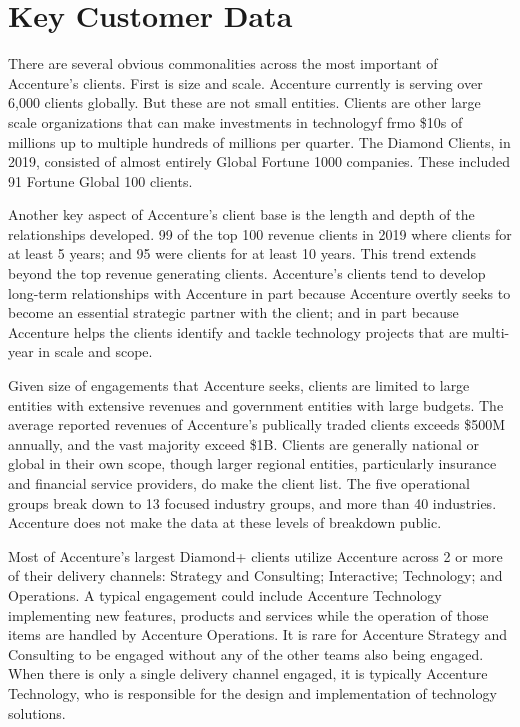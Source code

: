 \section{Key Customer Data}

There are several obvious commonalities across the most important of Accenture's clients. First is size and scale. Accenture currently is serving over 6,000 clients globally. But these are not small entities. Clients are other large scale organizations that can make investments in technologyf frmo \$10s of millions up to multiple hundreds of millions per quarter. The Diamond Clients, in 2019, consisted of almost entirely Global Fortune 1000 companies. These included 91 Fortune Global 100 clients.

Another key aspect of Accenture's client base is the length and depth of the relationships developed. 99 of the top 100 revenue clients in 2019 where clients for at least 5 years; and 95 were clients for at least 10 years. This trend extends beyond the top revenue generating clients. Accenture's clients tend to develop long-term relationships with Accenture in part because Accenture overtly seeks to become an essential strategic partner with the client; and in part because Accenture helps the clients identify and tackle technology projects that are multi-year in scale and scope.

Given size of engagements that Accenture seeks, clients are limited to large entities with extensive revenues and government entities with large budgets. The average reported revenues of Accenture's publically traded clients exceeds \$500M annually, and the vast majority exceed \$1B.  Clients are generally national or global in their own scope, though larger regional entities, particularly insurance and financial service providers, do make the client list. The five operational groups break down to 13 focused industry groups, and more than 40 industries. Accenture does not make the data at these levels of breakdown public.

Most of Accenture's largest Diamond+ clients utilize Accenture across 2 or more of their delivery channels: Strategy and Consulting; Interactive; Technology; and Operations. A typical engagement could include Accenture Technology implementing new features, products and services while the operation of those items are handled by Accenture Operations. It is rare for Accenture Strategy and Consulting to be engaged without any of the other teams also being engaged. When there is only a single delivery channel engaged, it is typically Accenture Technology, who is responsible for the design and implementation of technology solutions.

